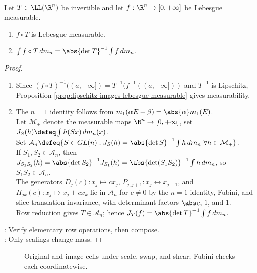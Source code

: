 \begin{theorem} \label{thm:linear-change-of-variables-nonnegative} \\
Let $T\in\LL(\R^n)$ be invertible and let $f:\R^n\to[0,+\infty]$ be Lebesgue measurable.
\begin{enumerate}[label=(\roman*)]
\setlength{\itemsep}{0pt}
\item $f\circ T$ is Lebesgue measurable.
\item $\int f\circ T\,dm_n=\abs{\det T}^{-1}\int f\,dm_n$.
\end{enumerate}
\begin{proof}
\begin{enumerate}[label=(\roman*)]
\setlength{\itemsep}{0pt}
\item Since $(f\circ T)^{-1}((a,+\infty])=T^{-1}(f^{-1}((a,+\infty]))$ and $T^{-1}$ is Lipschitz, Proposition \ref{prop:lipschitz-images-lebesgue-measurable} gives measurability.
\item The $n=1$ identity follows from $m_1(\alpha E+\beta)=\abs{\alpha}m_1(E)$.\\
Let $\mathcal M_+$ denote the measurable maps $\R^n\to[0,+\infty]$, set $J_S(h)\defeq\int h(Sx)\,dm_n(x)$.\\
Set $\mathcal A_n\defeq\{S\in GL(n):J_S(h)=\abs{\det S}^{-1}\int h\,dm_n\ \forall h\in\mathcal M_+\}$.\\
If $S_1,S_2\in\mathcal A_n$, then $J_{S_1S_2}(h)=\abs{\det S_2}^{-1}J_{S_1}(h)=\abs{\det(S_1S_2)}^{-1}\int h\,dm_n$, so $S_1S_2\in\mathcal A_n$.\\
The generators $D_j(c):x_j\mapsto cx_j$, $P_{j,j+1}:x_j\leftrightarrow x_{j+1}$, and $H_{jk}(c):x_j\mapsto x_j+cx_k$ lie in $\mathcal A_n$ for $c\neq0$ by the $n=1$ identity, Fubini, and slice translation invariance, with determinant factors $\abs c$, $1$, and $1$.\\
Row reduction gives $T\in\mathcal A_n$; hence $J_T(f)=\abs{\det T}^{-1}\int f\,dm_n$.
\end{enumerate}
: Verify elementary row operations, then compose.\\
: Only scalings change mass.
\end{proof}
\end{theorem}

\begin{figure}[H]
  \centering
  
  \caption{\textcolor{blue!60!black}{Original} and \textcolor{red!70!black}{image} cells under scale, swap, and shear; Fubini checks each coordinatewise.}
  \label{fig:elementary-linear-change-maps}
\end{figure}

